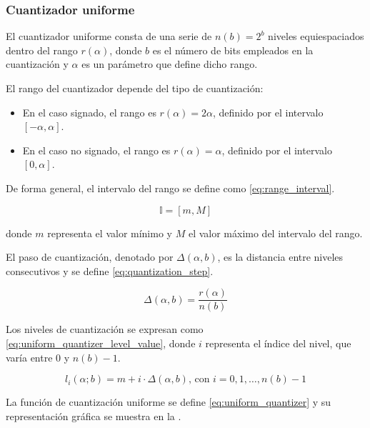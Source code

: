 \subsubsection{Cuantizador uniforme}
\label{sec:uniform}

El cuantizador uniforme consta de una serie de $n(b) = 2^b$ niveles equiespaciados dentro del rango $r(\alpha)$, donde $b$ es el número de bits empleados en la cuantización y $\alpha$ es un parámetro que define dicho rango.

El rango del cuantizador depende del tipo de cuantización:

\begin{itemize}
    \item En el caso signado, el rango es $r(\alpha) = 2\alpha$, definido por el intervalo $[-\alpha, \alpha].$
    \item En el caso no signado, el rango es $r(\alpha) = \alpha$, definido por el intervalo $[0, \alpha].$
\end{itemize}

De forma general, el intervalo del rango se define como \eqref{eq:range_interval}.

\begin{equation}
    \label{eq:range_interval}
    \mathbb{I} = [m, M]
\end{equation}

donde $m$ representa el valor mínimo y $M$ el valor máximo del intervalo del rango.

El paso de cuantización, denotado por $\Delta(\alpha, b)$, es la distancia entre niveles consecutivos y se define \eqref{eq:quantization_step}.

\begin{equation}
    \label{eq:quantization_step}
    \Delta(\alpha, b) = \frac{r(\alpha)}{n(b)}
\end{equation}

Los niveles de cuantización se expresan como \eqref{eq:uniform_quantizer_level_value}, donde $i$ representa el índice del nivel, que varía entre $0$ y $n(b)-1$.

\begin{equation}
    \label{eq:uniform_quantizer_level_value}
    l_i\left(\alpha; b\right) = m + i \cdot \Delta\left(\alpha, b\right) \text{, con } i = 0, 1, \ldots, n\left(b\right) - 1
\end{equation}

La función de cuantización uniforme se define \eqref{eq:uniform_quantizer} y su representación gráfica se muestra en la .


